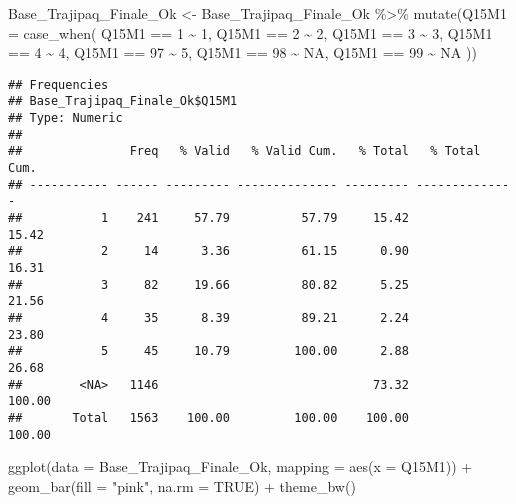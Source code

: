 \documentclass[
]{article}
\newenvironment{Shaded}{\begin{snugshade}}{\end{snugshade}}
\newcommand{\AttributeTok}[1]{\textcolor[rgb]{0.77,0.63,0.00}{#1}}
\newcommand{\ConstantTok}[1]{\textcolor[rgb]{0.00,0.00,0.00}{#1}}
\newcommand{\DecValTok}[1]{\textcolor[rgb]{0.00,0.00,0.81}{#1}}
\newcommand{\FunctionTok}[1]{\textcolor[rgb]{0.00,0.00,0.00}{#1}}
\newcommand{\NormalTok}[1]{#1}
\newcommand{\OtherTok}[1]{\textcolor[rgb]{0.56,0.35,0.01}{#1}}
\newcommand{\SpecialCharTok}[1]{\textcolor[rgb]{0.00,0.00,0.00}{#1}}
\newcommand{\StringTok}[1]{\textcolor[rgb]{0.31,0.60,0.02}{#1}}
\begin{document}
\begin{Shaded}
\begin{Highlighting}[]
\NormalTok{Base\_Trajipaq\_Finale\_Ok }\OtherTok{\textless{}{-}}
\NormalTok{  Base\_Trajipaq\_Finale\_Ok }\SpecialCharTok{\%\textgreater{}\%}
  \FunctionTok{mutate}\NormalTok{(}\AttributeTok{Q15M1 =} \FunctionTok{case\_when}\NormalTok{(}
\NormalTok{    Q15M1 }\SpecialCharTok{==} \DecValTok{1} \SpecialCharTok{\textasciitilde{}} \DecValTok{1}\NormalTok{,}
\NormalTok{    Q15M1 }\SpecialCharTok{==} \DecValTok{2} \SpecialCharTok{\textasciitilde{}} \DecValTok{2}\NormalTok{,}
\NormalTok{    Q15M1 }\SpecialCharTok{==} \DecValTok{3} \SpecialCharTok{\textasciitilde{}} \DecValTok{3}\NormalTok{,}
\NormalTok{    Q15M1 }\SpecialCharTok{==} \DecValTok{4} \SpecialCharTok{\textasciitilde{}} \DecValTok{4}\NormalTok{,}
\NormalTok{    Q15M1 }\SpecialCharTok{==} \DecValTok{97} \SpecialCharTok{\textasciitilde{}} \DecValTok{5}\NormalTok{,}
\NormalTok{    Q15M1 }\SpecialCharTok{==} \DecValTok{98} \SpecialCharTok{\textasciitilde{}} \ConstantTok{NA}\NormalTok{,}
\NormalTok{    Q15M1 }\SpecialCharTok{==} \DecValTok{99} \SpecialCharTok{\textasciitilde{}} \ConstantTok{NA}
\NormalTok{  ))}
\end{Highlighting}
\end{Shaded}

\begin{Shaded}
\end{Shaded}

\begin{verbatim}
## Frequencies  
## Base_Trajipaq_Finale_Ok$Q15M1  
## Type: Numeric  
## 
##               Freq   % Valid   % Valid Cum.   % Total   % Total Cum.
## ----------- ------ --------- -------------- --------- --------------
##           1    241     57.79          57.79     15.42          15.42
##           2     14      3.36          61.15      0.90          16.31
##           3     82     19.66          80.82      5.25          21.56
##           4     35      8.39          89.21      2.24          23.80
##           5     45     10.79         100.00      2.88          26.68
##        <NA>   1146                              73.32         100.00
##       Total   1563    100.00         100.00    100.00         100.00
\end{verbatim}

\begin{Shaded}
\begin{Highlighting}[]
\FunctionTok{ggplot}\NormalTok{(}\AttributeTok{data =}\NormalTok{ Base\_Trajipaq\_Finale\_Ok, }\AttributeTok{mapping =} \FunctionTok{aes}\NormalTok{(}\AttributeTok{x =}\NormalTok{ Q15M1)) }\SpecialCharTok{+}
  \FunctionTok{geom\_bar}\NormalTok{(}\AttributeTok{fill =} \StringTok{"pink"}\NormalTok{, }\AttributeTok{na.rm =} \ConstantTok{TRUE}\NormalTok{) }\SpecialCharTok{+}
  \FunctionTok{theme\_bw}\NormalTok{()}
\end{Highlighting}
\end{Shaded}
\end{document}
